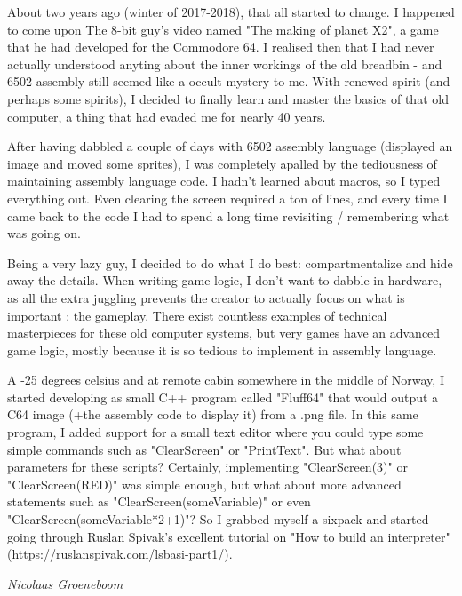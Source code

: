 About two years ago (winter of 2017-2018), that all started to change. I happened to come upon The 8-bit guy's video named "The making of planet X2", a game that he had developed for the Commodore 64. I realised then that I had never actually understood anyting about the inner workings of the old breadbin - and 6502 assembly still seemed like a occult mystery to me. With renewed spirit (and perhaps some spirits), I decided to finally learn and master the basics of that old computer, a thing that had evaded me for nearly 40 years. 

After having dabbled a couple of days with 6502 assembly language (displayed an image and moved some sprites), I was completely apalled by the tediousness of maintaining assembly language code. I hadn't learned about macros, so I typed everything out. Even clearing the screen required a ton of lines, and every time I came back to the code I had to spend a long time revisiting / remembering what was going on. 

Being a very lazy guy, I decided to do what I do best: compartmentalize and hide away the details. When writing game logic, I don't want to dabble in hardware, as all the extra juggling prevents the creator to actually focus on what is important : the gameplay. There exist countless examples of technical masterpieces for these old computer systems, but very games have an advanced game logic, mostly because it is so tedious to implement in assembly language. 

A -25 degrees celsius and at remote cabin somewhere in the middle of Norway, I started developing as small C++ program called "Fluff64" that would output a C64 image (+the assembly code to display it) from a .png file. In this same program, I added support for a small text editor where you could type some simple commands such as "ClearScreen" or "PrintText". But what about parameters for these scripts? Certainly, implementing "ClearScreen(3)" or "ClearScreen(RED)" was simple enough, but what about more advanced statements such as "ClearScreen(someVariable)" or even "ClearScreen(someVariable*2+1)"? So I grabbed myself a sixpack and started going through Ruslan Spivak's excellent tutorial on "How to build an interpreter" (https://ruslanspivak.com/lsbasi-part1/). 



\begin{flushright}
	\textit{Nicolaas Groeneboom}
\end{flushright}

